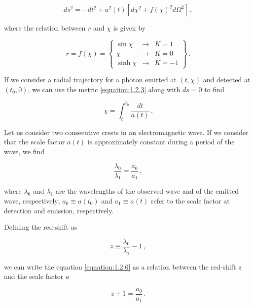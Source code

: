 \begin{equation}
ds^2=-dt^2+a^2(t)\left[d\chi^2+f(\chi)^2d\Omega^2\right] \, ,
\label{equation:1.2.3}
\end{equation}

where the relation between $ r $ and $ \chi $ is given by

\begin{equation}
r=f(\chi)=\left \{\begin{array}{lll} \sin\chi & \longrightarrow & K=1\\
\chi & \longrightarrow & K=0\\
\sinh\chi & \longrightarrow & K=-1\end{array}\right \} \, .
\label{equation:1.2.4}
\end{equation}

If we consider a radial trajectory for a photon emitted at $ (t,\chi) $ and detected at $ (t_0, 0) $, we can use the metric \eqref{equation:1.2.3} along with $ ds=0 $ to find

\begin{equation}
\chi=\int_t^{t_0}{\frac{dt}{a(t)}} \, .
\label{equation:1.2.5}
\end{equation}

Let us consider two consecutive crests in an electromagnetic wave. If we consider that the scale factor $ a(t) $ is approximately constant during a period of the wave, we find   

\begin{equation}
\frac{\lambda_0}{\lambda_1}=\frac{a_0}{a_1} \, ,
\label{equation:1.2.6}
\end{equation}

where $ \lambda_0 $ and $ \lambda_1 $ are the wavelengths of the observed wave and of the emitted wave, respectively; $ a_0\equiv a(t_0) $ and $ a_1 \equiv a(t) $ refer to the scale factor at detection and emission, respectively. 

Defining the red-shift as 

\begin{equation}
z \equiv \frac{\lambda_0}{\lambda_1}-1 \, ,
\label{equation:1.2.7}
\end{equation}

we can write the equation \eqref{equation:1.2.6} as a relation between the red-shift $ z $ and the scale factor $ a $

\begin{equation}
z+1=\frac{a_0}{a_1} \, .
\label{equation:1.2.8}
\end{equation}

